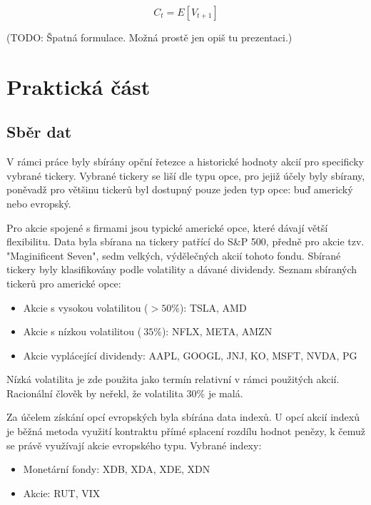 \documentclass{article}
\begin{document}
  $$ C_t = E[V_{t+1}] $$

  (TODO: Špatná formulace. Možná prostě jen opiš tu prezentaci.)

  \section{Praktická část}

  \subsection{Sběr dat}

  V rámci práce byly sbírány opční řetezce a historické hodnoty akcií pro specificky vybrané tickery.
  Vybrané tickery se liší dle typu opce, pro jejiž účely byly sbírany, poněvadž pro většinu tickerů byl dostupný pouze jeden typ opce: buď americký nebo evropský.

  Pro akcie spojené s firmami jsou typické americké opce, které dávají větší flexibilitu. Data byla sbírana na tickery patřící do S\&P 500, předně pro akcie tzv. "Maginificent Seven", sedm velkých, výdělečných akcií tohoto fondu. Sbírané tickery byly klasifikovány podle volatility a dávané dividendy. Seznam sbíraných tickerů pro americké opce: 
  \begin{itemize}
    \item{Akcie s vysokou volatilitou ($ > 50\% $): TSLA, AMD}
    \item{Akcie s nízkou volatilitou ($~35\%$): NFLX, META, AMZN}
    \item{Akcie vyplácející dividendy: AAPL, GOOGL, JNJ, KO, MSFT, NVDA, PG}
  \end{itemize}

  Nízká volatilita je zde použita jako termín relativní v rámci použitých akcií. Racionální člověk by neřekl, že volatilita 30\% je malá.

  Za účelem získání opcí evropských byla sbírána data indexů. U opcí akcií indexů je běžná metoda využití kontraktu přímé splacení rozdílu hodnot penězy, k čemuž se právě využívají akcie evropského typu. Vybrané indexy:
  \begin{itemize}
    \item{Monetární fondy: XDB, XDA, XDE, XDN}
    \item{Akcie: RUT, VIX}
  \end{itemize}
\end{document}
